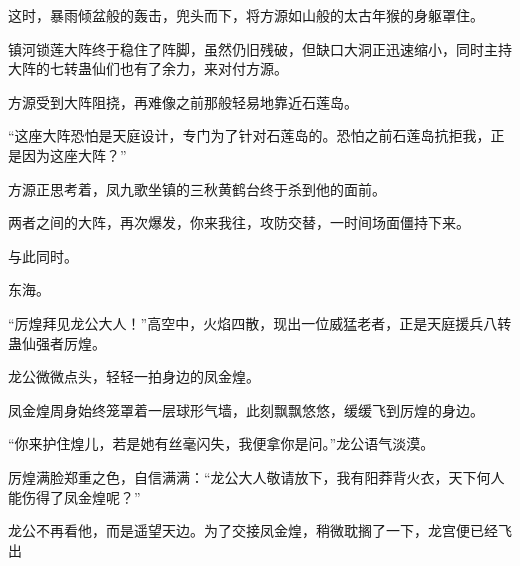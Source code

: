 \begin{this_body}
这时，暴雨倾盆般的轰击，兜头而下，将方源如山般的太古年猴的身躯罩住。

镇河锁莲大阵终于稳住了阵脚，虽然仍旧残破，但缺口大洞正迅速缩小，同时主持大阵的七转蛊仙们也有了余力，来对付方源。

方源受到大阵阻挠，再难像之前那般轻易地靠近石莲岛。

“这座大阵恐怕是天庭设计，专门为了针对石莲岛的。恐怕之前石莲岛抗拒我，正是因为这座大阵？”

方源正思考着，凤九歌坐镇的三秋黄鹤台终于杀到他的面前。

两者之间的大阵，再次爆发，你来我往，攻防交替，一时间场面僵持下来。

与此同时。

东海。

“厉煌拜见龙公大人！”高空中，火焰四散，现出一位威猛老者，正是天庭援兵八转蛊仙强者厉煌。

龙公微微点头，轻轻一拍身边的凤金煌。

凤金煌周身始终笼罩着一层球形气墙，此刻飘飘悠悠，缓缓飞到厉煌的身边。

“你来护住煌儿，若是她有丝毫闪失，我便拿你是问。”龙公语气淡漠。

厉煌满脸郑重之色，自信满满：“龙公大人敬请放下，我有阳莽背火衣，天下何人能伤得了凤金煌呢？”

龙公不再看他，而是遥望天边。为了交接凤金煌，稍微耽搁了一下，龙宫便已经飞出

\end{this_body}

